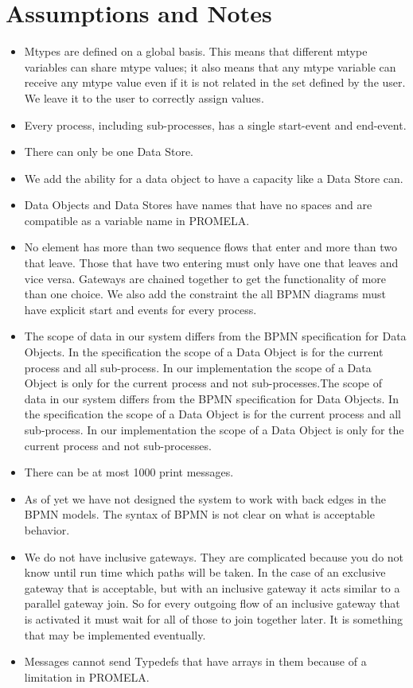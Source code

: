 \documentclass[11pt,twocolumn]{article}
\begin{document}
\section{Assumptions and Notes}
\begin{itemize}
  \item Mtypes are defined on a global basis. This means that different mtype variables can share mtype values; it also means that any mtype variable can receive any mtype value even if it is not related in the set defined by the user. We leave it to the user to correctly assign values.
  \item Every process, including sub-processes, has a single start-event and end-event.
  \item There can only be one Data Store.
 \item We add the ability for a data object to have a capacity like a Data Store can.
  \item Data Objects and Data Stores have names that have no spaces and are compatible as a variable name in PROMELA.
  \item No element has more than two sequence flows that enter and more than two that leave. Those that have two entering must only have one that leaves and vice versa. Gateways are chained together to get the functionality of more than one choice. We also add the constraint the all BPMN diagrams must have explicit start and events for every process. 
  \item The scope of data in our system differs from the BPMN specification for Data Objects. In the specification the scope of a Data Object is for the current process and all sub-process. In our implementation the scope of a Data Object is only for the current process and not sub-processes.The scope of data in our system differs from the BPMN specification for Data Objects. In the specification the scope of a Data Object is for the current process and all sub-process. In our implementation the scope of a Data Object is only for the current process and not sub-processes.
  
  \item There can be at most 1000 print messages.
  
  \item As of yet we have not designed the system to work with back edges in the BPMN models. The syntax of BPMN is not clear on what is acceptable behavior. 

  \item We do not have inclusive gateways. They are complicated because you do not know until run time which paths will be taken. In the case of an exclusive gateway that is acceptable, but with an inclusive gateway it acts similar to a parallel gateway join. So for every outgoing flow of an inclusive gateway that is activated it must wait for all of those to join together later. It is something that may be implemented eventually.
  
  \item Messages cannot send Typedefs that have arrays in them because of a limitation in PROMELA.
  
\end{itemize}
\end{document}
